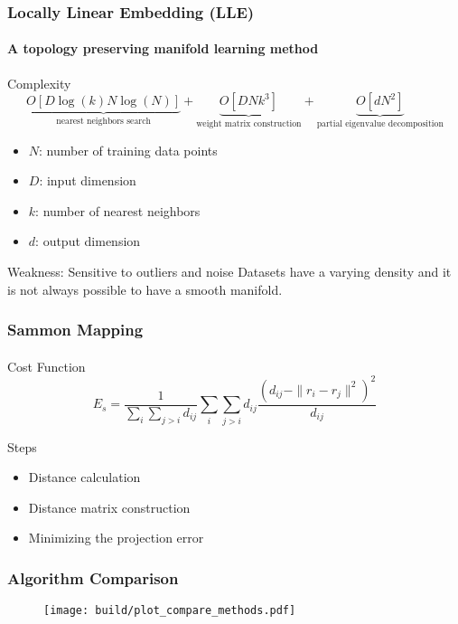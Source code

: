 \documentclass{beamer}
\begin{document}
\begin{frame}
  \frametitle{Locally Linear Embedding (LLE)}
  \framesubtitle{A topology preserving manifold learning method}
  
  \begin{block}{Complexity}
    \[
      \underbrace{O[D \log(k) N \log(N)]}_{\text{nearest neighbors search}}  + 
      \underbrace{O[D N k^3]}_{\text{weight matrix construction}} + 
      \underbrace{O[d N^2]}_{\text{partial eigenvalue decomposition}}
    \]
    \begin{itemize}
      \item $N$: number of training data points
      \item $D$: input dimension
      \item $k$: number of nearest neighbors
      \item $d$: output dimension
    \end{itemize}
  \end{block}

  
  \begin{block}{Weakness: Sensitive to outliers and noise}
    Datasets have a varying density and it is not always possible to have a smooth manifold.
  \end{block}
  
\end{frame}

% 
% 
% 
% 
% 
% 
\begin{frame}
  \frametitle{Sammon Mapping }
  \framesubtitle{}

  Cost Function
  \[
    E_s = \frac{1}{\sum_i \sum_{j > i} d_{ij}} 
    \sum_i \sum_{j > i} d_{ij}
    \frac{(d_{ij} - \|r_i - r_j\|^2)^2}{d_{ij}}
  \]

  Steps
  \begin{itemize}
    \item Distance calculation
    \item Distance matrix construction
    \item Minimizing the projection error
  \end{itemize}

\end{frame}


% 
% 
% 
% 
% 
%
\begin{frame}
\frametitle{Algorithm Comparison}
\begin{figure}
  \centering
  \texttt{[image: build/plot\_compare\_methods.pdf]}
\end{figure}
\end{frame}
\end{document}
